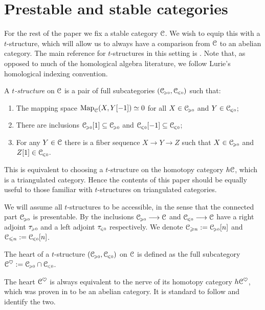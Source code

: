 
\section{Prestable and stable categories}
\label{ch3:sec:prestable-and-stable-categories}

For the rest of the paper we fix a stable category $\C$. We wish to equip this with a $t$-structure, which will allow us to always have a comparison from $\C$ to an abelian category. The main reference for $t$-structures in this setting is \cite[Sec 1.2.1]{Lurie_HA}. Note that, as opposed to much of the homological algebra literature, we follow Lurie's homological indexing convention.  

\begin{definition}
    A \emph{$t$-structure} on $\C$ is a pair of full subcategories $(\C\geqz, \C\leqz)$ such that:
    \begin{enumerate}
        \item The mapping space $\Map_\C(X,Y[-1])\simeq 0$ for all $X\in \C\geqz$ and $Y\in \C\leqz$;
        \item There are inclusions $\C\geqz[1]\subseteq \C\geqz$ and $\C\leqz[-1]\subseteq \C\leqz$;
        \item For any $Y\in \C$ there is a fiber sequence $X\to Y\to Z$ such that $X\in \C\geqz$ and $Z[1]\in \C\leqz$. 
    \end{enumerate} 
\end{definition}

This is equivalent to choosing a $t$-structure on the homotopy category $h\C$, which is a triangulated category. Hence the contents of this paper should be equally useful to those familiar with $t$-structures on triangulated categories. 

We will assume all $t$-structures to be accessible, in the sense that the connected part $\C\geqz$ is presentable. By \cite[1.2.16]{Lurie_HA} the inclusions $\C\geqz\to \C$ and $\C\leqz\to \C$ have a right adjoint $\tau\geqz$ and a left adjoint $\tau\leqz$ respectively. We denote $\C_{\geq n} := \C\geqz[n]$ and $\C_{\leq n} := \C\leqz[n]$. 

\begin{definition}
    The heart of a $t$-structure $(\C\geqz, \C\leqz)$ on $\C$ is defined as the full subcategory $\C^\heart := \C\geqz\cap\C\leqz$.
\end{definition}

The heart $\C^\heart$ is always equivalent to the nerve of its homotopy category $h\C^\heart$, which was proven in \cite{beilinson-bernstein-deligne_1983} to be an abelian category. It is standard to follow \cite[1.2.1.12]{Lurie_HA} and identify the two. 

